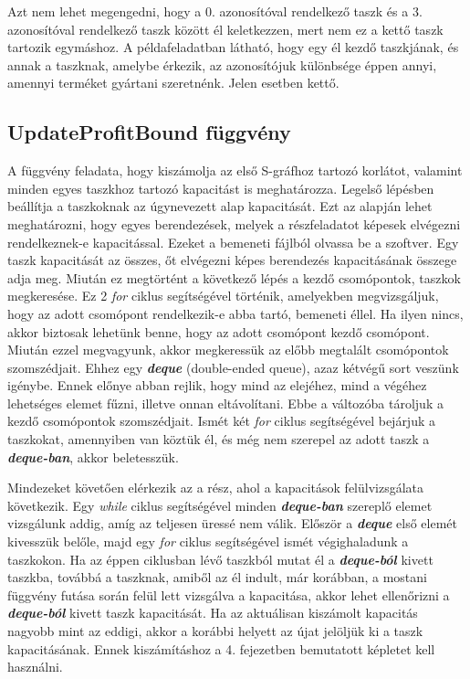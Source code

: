 Azt nem lehet megengedni, hogy a 0. azonosítóval rendelkező taszk és a 3. azonosítóval rendelkező taszk között él keletkezzen, mert nem ez a kettő taszk tartozik egymáshoz.
A példafeladatban látható, hogy egy él kezdő taszkjának, és annak a taszknak, amelybe érkezik, az azonosítójuk különbsége éppen annyi, amennyi terméket gyártani szeretnénk.
Jelen esetben kettő. 

\subsection{UpdateProfitBound függvény}
A függvény feladata, hogy kiszámolja az első S-gráfhoz tartozó korlátot, valamint minden egyes taszkhoz tartozó kapacitást is meghatározza.
Legelső lépésben beállítja a taszkoknak az úgynevezett alap kapacitását.
Ezt az alapján lehet meghatározni, hogy egyes berendezések, melyek a részfeladatot képesek elvégezni rendelkeznek-e kapacitással.
Ezeket a bemeneti fájlból olvassa be a szoftver.
Egy taszk kapacitását az összes, őt elvégezni képes berendezés kapacitásának összege adja meg.
Miután ez megtörtént a következő lépés a kezdő csomópontok, taszkok megkeresése.
Ez 2 \textit{for} ciklus segítségével történik, amelyekben megvizsgáljuk, hogy az adott csomópont rendelkezik-e abba tartó, bemeneti éllel.
Ha ilyen nincs, akkor biztosak lehetünk benne, hogy az adott csomópont kezdő csomópont.
Miután ezzel megvagyunk, akkor megkeressük az előbb megtalált csomópontok szomszédjait.
Ehhez egy \textbf{\textit{deque}} (double-ended queue), azaz kétvégű sort veszünk igénybe.
Ennek előnye abban rejlik, hogy mind az elejéhez, mind a végéhez lehetséges elemet fűzni, illetve onnan eltávolítani.
Ebbe a változóba tároljuk a kezdő csomópontok szomszédjait.
Ismét két \textit{for} ciklus segítségével bejárjuk a taszkokat, amennyiben van köztük él, és még nem szerepel az adott taszk a \textbf{\textit{deque-ban}}, akkor beletesszük.

Mindezeket követően elérkezik az a rész, ahol a kapacitások felülvizsgálata következik.
Egy \textit{while} ciklus segítségével minden \textbf{\textit{deque-ban}} szereplő elemet vizsgálunk addig, amíg az teljesen üressé nem válik.
Először a \textbf{\textit{deque}} első elemét kivesszük belőle, majd egy \textit{for} ciklus segítségével ismét végighaladunk a taszkokon.
Ha az éppen ciklusban lévő taszkból mutat él a \textbf{\textit{deque-ból}} kivett taszkba, továbbá a taszknak, amiből az él indult, már korábban, a mostani függvény futása során felül lett vizsgálva a kapacitása, akkor lehet ellenőrizni a \textbf{\textit{deque-ból}} kivett taszk kapacitását.
Ha az aktuálisan kiszámolt kapacitás nagyobb mint az eddigi, akkor a korábbi helyett az újat jelöljük ki a taszk kapacitásának.
Ennek kiszámításhoz a 4. fejezetben bemutatott képletet kell használni.

